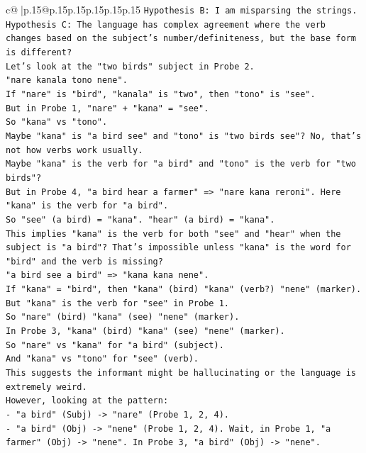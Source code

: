 \documentclass{article}
\begin{document}
{\begin{supertabular}{c@{$\;$}|p{.15\linewidth}@{}p{.15\linewidth}p{.15\linewidth}p{.15\linewidth}p{.15\linewidth}p{.15\linewidth}}
{{{\texttt{Hypothesis B: I am misparsing the strings.} \\
\texttt{Hypothesis C: The language has complex agreement where the verb changes based on the subject's number/definiteness, but the base form is different?} \\
\texttt{Let's look at the "two birds" subject in Probe 2.} \\
\texttt{"nare kanala tono nene".} \\
\texttt{If "nare" is "bird", "kanala" is "two", then "tono" is "see".} \\
\texttt{But in Probe 1, "nare" + "kana" = "see".} \\
\texttt{So "kana" vs "tono".} \\
\texttt{Maybe "kana" is "a bird see" and "tono" is "two birds see"? No, that's not how verbs work usually.} \\
\texttt{Maybe "kana" is the verb for "a bird" and "tono" is the verb for "two birds"?} \\
\texttt{But in Probe 4, "a bird hear a farmer" => "nare kana reroni". Here "kana" is the verb for "a bird".} \\
\texttt{So "see" (a bird) = "kana". "hear" (a bird) = "kana".} \\
\texttt{This implies "kana" is the verb for both "see" and "hear" when the subject is "a bird"? That's impossible unless "kana" is the word for "bird" and the verb is missing?} \\
\texttt{"a bird see a bird" => "kana kana nene".} \\
\texttt{If "kana" = "bird", then "kana" (bird) "kana" (verb?) "nene" (marker).} \\
\texttt{But "kana" is the verb for "see" in Probe 1.} \\
\texttt{So "nare" (bird) "kana" (see) "nene" (marker).} \\
\texttt{In Probe 3, "kana" (bird) "kana" (see) "nene" (marker).} \\
\texttt{So "nare" vs "kana" for "a bird" (subject).} \\
\texttt{And "kana" vs "tono" for "see" (verb).} \\
\texttt{This suggests the informant might be hallucinating or the language is extremely weird.} \\
\texttt{However, looking at the pattern:} \\
\texttt{{-} "a bird" (Subj) {-}> "nare" (Probe 1, 2, 4).} \\
\texttt{{-} "a bird" (Obj) {-}> "nene" (Probe 1, 2, 4). Wait, in Probe 1, "a farmer" (Obj) {-}> "nene". In Probe 3, "a bird" (Obj) {-}> "nene".} \\
}}}
\end{supertabular}}
\end{document}
